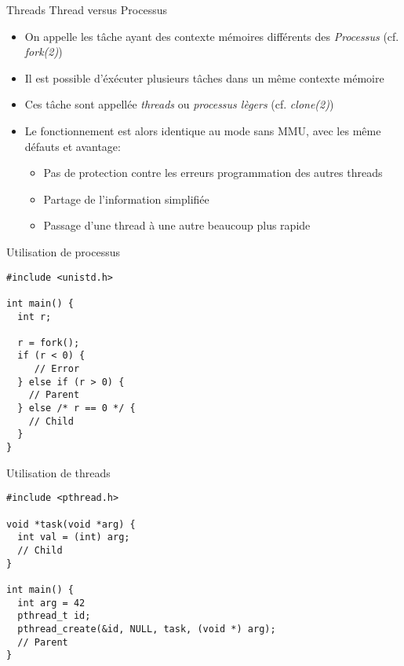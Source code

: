 \begin{frame}{Threads}
  Thread versus Processus
  \begin{itemize}
  \item On  appelle les tâche  ayant des contexte  mémoires différents
    des \emph{Processus} (cf. \emph{fork(2)})
  \item  Il est  possible  d'éxécuter plusieurs  tâches  dans un  même
    contexte mémoire
  \item  Ces  tâche sont  appellée  \emph{threads} ou  \emph{processus
      lègers} (cf. \emph{clone(2)})
  \item Le fonctionnement  est alors identique au mode  sans MMU, avec
    les même défauts et avantage:
    \begin{itemize}
    \item  Pas  de protection  contre  les  erreurs programmation  des
      autres threads
    \item Partage de l'information simplifiée
    \item Passage d'une thread à une autre beaucoup plus rapide
    \end{itemize}
  \end{itemize}
\end{frame} 

\begin{frame}[fragile]{Utilisation de processus}
\begin{lstlisting}
#include <unistd.h>

int main() {
  int r;

  r = fork();
  if (r < 0) {
     // Error
  } else if (r > 0) {
    // Parent
  } else /* r == 0 */ {
    // Child
  }
}
\end{lstlisting} 
\end{frame} 

\begin{frame}[fragile]{Utilisation de threads}
\begin{lstlisting}
#include <pthread.h>

void *task(void *arg) {
  int val = (int) arg;
  // Child
}

int main() {
  int arg = 42
  pthread_t id;
  pthread_create(&id, NULL, task, (void *) arg);
  // Parent
}
\end{lstlisting} 
\end{frame} 


